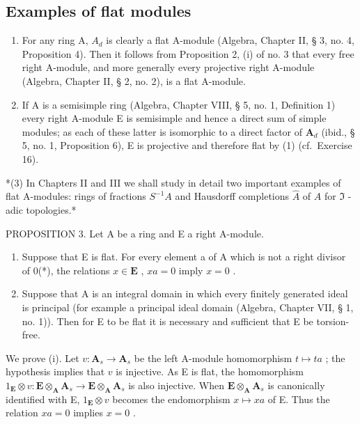 \subsection{Examples of flat modules}

\begin{enumerate}
\def\labelenumi{(\arabic{enumi})}
\item
  For any ring A, \(A_{d}\) is clearly a flat A-module (Algebra, Chapter II, § 3, no. 4, Proposition 4). Then it follows from Proposition 2, (i) of no. 3 that every free right A-module, and more generally every projective right A-module (Algebra, Chapter II, § 2, no. 2), is a flat A-module.
\item
  If A is a semisimple ring (Algebra, Chapter VIII, § 5, no. 1, Definition 1) every right A-module E is semisimple and hence a direct sum of simple modules; as each of these latter is isomorphic to a direct factor of \(\mathbf{A}_d\) (ibid., § 5, no. 1, Proposition 6), E is projective and therefore flat by (1) (cf.~Exercise 16).
\end{enumerate}

*(3) In Chapters II and III we shall study in detail two important examples of flat A-modules: rings of fractions \(S^{-1}A\) and Hausdorff completions \(\hat{A}\) of \(A\) for \(\mathfrak{I}\) -adic topologies.*

PROPOSITION 3. Let A be a ring and E a right A-module.

\begin{enumerate}
\def\labelenumi{(\roman{enumi})}
\item
  Suppose that E is flat. For every element a of A which is not a right divisor of 0(*), the relations \(x \in \mathbf{E}\) , \(xa = 0\) imply \(x = 0\) .
\item
  Suppose that A is an integral domain in which every finitely generated ideal is principal (for example a principal ideal domain (Algebra, Chapter VII, § 1, no. 1)). Then for E to be flat it is necessary and sufficient that E be torsion-free.
\end{enumerate}

We prove (i). Let \(v: \mathbf{A}_s \to \mathbf{A}_s\) be the left A-module homomorphism \(t \mapsto ta\) ; the hypothesis implies that \(v\) is injective. As E is flat, the homomorphism \(1_{\mathbf{E}} \otimes v: \mathbf{E} \otimes_{\mathbf{A}} \mathbf{A}_s \to \mathbf{E} \otimes_{\mathbf{A}} \mathbf{A}_s\) is also injective. When \(\mathbf{E} \otimes_{\mathbf{A}} \mathbf{A}_s\) is canonically identified with E, \(1_{\mathbf{E}} \otimes v\) becomes the endomorphism \(x \mapsto xa\) of E. Thus the relation \(xa = 0\) implies \(x = 0\) .


